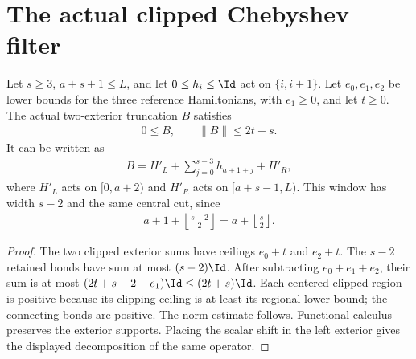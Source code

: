 \section{The actual clipped Chebyshev filter}

\begin{lemma}
    \label{lem:aklv_clipped_hamiltonian_data}
    \leanok
    Let $s\ge3$, $a+s+1\le L$, and let $0\le h_i\le\Id$ act on
    $\{i,i+1\}$. Let $e_0,e_1,e_2$ be lower bounds for the three reference
    Hamiltonians, with $e_1\ge0$, and let $t\ge0$.
    The actual two-exterior truncation $B$ satisfies
    \begin{align*}
        0\le B,\qquad \|B\|\le2t+s.
    \end{align*}
    It can be written as
    \begin{align*}
        B=H'_L+\sum_{j=0}^{s-3}h_{a+1+j}+H'_R,
    \end{align*}
    where $H'_L$ acts on $[0,a+2)$ and $H'_R$ acts on ${[a+s-1,L)}$.
    This window has width $s-2$ and the same central cut, since
    \begin{align*}
        a+1+\left\lfloor\frac{s-2}{2}\right\rfloor
        =a+\left\lfloor\frac{s}{2}\right\rfloor.
    \end{align*}
\end{lemma}
\begin{proof}
    \leanok
    The two clipped exterior sums have ceilings $e_0+t$ and $e_2+t$.
    The $s-2$ retained bonds have sum at most $(s-2)\Id$.
    After subtracting $e_0+e_1+e_2$, their sum is at most
    $(2t+s-2-e_1)\Id\le(2t+s)\Id$.
    Each centered clipped region is positive because its clipping ceiling
    is at least its regional lower bound; the connecting bonds are positive.
    The norm estimate follows. Functional calculus preserves the exterior
    supports. Placing the scalar shift in the left exterior gives the displayed
    decomposition of the same operator.
\end{proof}


